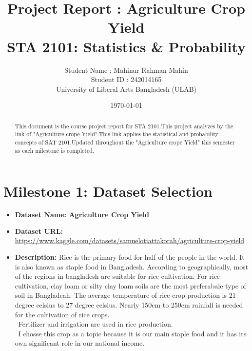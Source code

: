 \documentclass[12pt,a4paper]{article}
\title{\textbf{Project Report : Agriculture Crop Yield}\\
STA 2101: Statistics \& Probability}
\author{Student Name : Mahinur Rahman Mahin \\
Student ID : 242014165 \\
University of Liberal Arts Bangladesh (ULAB)}
\date{\today}
\begin{document}
\maketitle
\onehalfspacing

\begin{abstract}
This document is the course project report for STA 2101.This project analyzes by the link of "Agriculture crope Yield".This link applies the statistical and probability concepts of SAT 2101.Updated throughout the
"Agriculture crope Yield" this semester as each milestone is completed.
\end{abstract}

\tableofcontents
\newpage












\section{Milestone 1: Dataset Selection}
\begin{itemize}
    \item \textbf{Dataset Name: Agriculture Crop Yield} %
    \item \textbf{Dataset URL:} \\                \url{https://www.kaggle.com/datasets/samuelotiattakorah/agriculture-crop-yield}  
    \item \textbf{Description:} Rice is the primary food for half of the people in the world. It is also known as staple food in Bangladesh. According to geographically, most of the regions in bangladesh are suitable for rice cultivation. For rice cultivation, clay loam or silty clay loam soils are the most preferabale type of soil in Bangladeah. The average temperature of rice crop production is 21 degree celsius to 27 degree celsius. Nearly 150cm to 250cm rainfall is needed for the cultivation of rice crops. \\\
    Fertilizer and irrigation are used in rice production. \\\
    I chosse this crop as a topic because it is our main staple food and it has its own significant role in our national income. 
\end{itemize}

\end{document}
